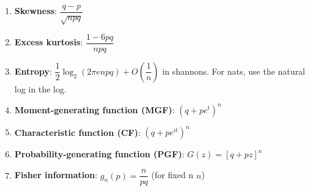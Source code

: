 \begin{enumerate}


    \item \textbf{Skewness}:
    $
         {\displaystyle {\dfrac {q-p}{\sqrt {npq}}}}
    $
    \hfill \cite{wiki/Binomial_distribution}

    \item \textbf{Excess kurtosis}:
    $
         {\displaystyle {\dfrac {1-6pq}{npq}}}
    $
    \hfill \cite{wiki/Binomial_distribution}

    \item \textbf{Entropy}:
     ${\displaystyle {\dfrac {1}{2}}\log _{2}(2\pi enpq)+O\left({\dfrac {1}{n}}\right)}$ in shannons. For nats, use the natural log in the log.
    \hfill \cite{wiki/Binomial_distribution}

    \item \textbf{Moment-generating function (MGF)}:
    $
         {\displaystyle (q+pe^{t})^{n}}
    $
    \hfill \cite{wiki/Binomial_distribution}

    \item \textbf{Characteristic function (CF)}:
    $
         {\displaystyle (q+pe^{it})^{n}}
    $
    \hfill \cite{wiki/Binomial_distribution}

    \item \textbf{Probability-generating function (PGF)}:
    $
         {\displaystyle G(z)=[q+pz]^{n}}
    $
    \hfill \cite{wiki/Binomial_distribution}

    \item \textbf{Fisher information}:
    ${\displaystyle g_{n}(p)={\dfrac {n}{pq}}}$ (for fixed n ${\displaystyle n}$)
    \hfill \cite{wiki/Binomial_distribution}
\end{enumerate}






